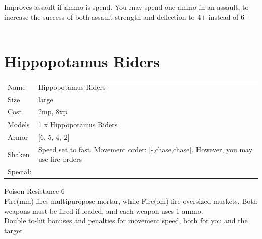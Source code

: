Improves assault if ammo is spend. You may spend one ammo in an assault, to increase the success of both assault strength and deflection to 4+ instead of 6+\\ 





 
\ \\













\clearpage

\section{ Hippopotamus Riders }

\begin{tabular}{ll}
  Name & Hippopotamus Riders \\
  Size & large\\
  Cost & 2mp, 8xp\\
  Models & 1 x Hippopotamus Riders\\
  Armor & [6, 5, 4, 2]\\
  Shaken & Speed set to fast. Movement order: [-,chase,chase]. However, you may use fire orders\\
  Special: \\
\end{tabular}

\noindent Poison Resistance 6\\ 
Fire(mm) fires multipuropose mortar, while Fire(om) fire oversized muskets.  Both weapons must be fired if loaded, and each weapon uses 1 ammo.\\ 
Double to-hit bonuses and penalties for movement speed, both for you and the target\\ 


